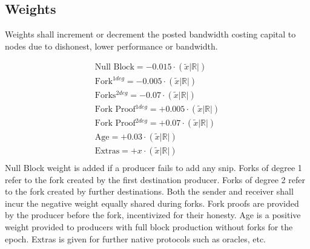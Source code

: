 \documentclass[../Bitcoin Blink.tex]{subfiles}
\begin{document}
\normalsize
\subsection{Weights}
Weights shall increment or decrement the posted bandwidth costing capital to nodes due to dishonest, lower performance or bandwidth.


\begin{align*}
\text{Null Block} = -0.015 \cdot (\widetilde{x}|\mathbb{R}|)\\
\text{Fork$^{1deg}$} = -0.005 \cdot (\widetilde{x}|\mathbb{R}|)\\
\text{Forks$^{2deg}$} = -0.07 \cdot (\widetilde{x}|\mathbb{R}|)\\
\text{Fork Proof$^{1deg}$} = +0.005 \cdot (\widetilde{x}|\mathbb{R}|)\\
\text{Fork Proof$^{2deg}$} = +0.07 \cdot (\widetilde{x}|\mathbb{R}|)\\
\text{Age} = +0.03 \cdot (\widetilde{x}|\mathbb{R}|)\\
\text{Extras} = +x \cdot (\widetilde{x}|\mathbb{R}|)\\
\end{align*}
Null Block weight is added if a producer fails to add any snip. Forks of degree 1 refer to the fork created by the first destination producer. Forks of degree 2 refer to the fork created by further destinations. Both the sender and receiver shall incur the negative weight equally shared during forks. Fork proofs are provided by the producer before the fork, incentivized for their honesty. Age is a positive weight provided to producers with full block production without forks for the epoch. Extras is given for further native protocols such as oracles, etc.
\end{document}

